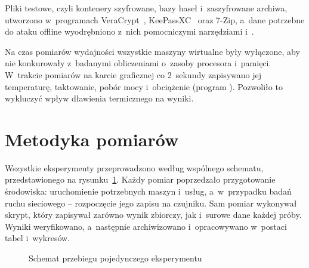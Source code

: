 Pliki testowe, czyli kontenery szyfrowane, bazy haseł i~zaszyfrowane archiwa, utworzono w~programach VeraCrypt~\cite{veracrypt}, KeePassXC~\cite{keepassxc} oraz 7-Zip, a~dane potrzebne do ataku offline wyodrębniono z~nich pomocniczymi narzędziami  i~.

Na czas pomiarów wydajności wszystkie maszyny wirtualne były wyłączone, aby nie konkurowały z~badanymi obliczeniami o~zasoby procesora i~pamięci. W~trakcie pomiarów na karcie graficznej co 2~sekundy zapisywano jej temperaturę, taktowanie, pobór mocy i~obciążenie (program ). Pozwoliło to wykluczyć wpływ dławienia termicznego na wyniki.

\section{Metodyka pomiarów}\label{sec:metodyka}

Wszystkie eksperymenty przeprowadzono według wspólnego schematu, przedstawionego na rysunku~\ref{rys:przebieg}. Każdy pomiar poprzedzało przygotowanie środowiska: uruchomienie potrzebnych maszyn i~usług, a~w~przypadku badań ruchu sieciowego -- rozpoczęcie jego zapisu na czujniku. Sam pomiar wykonywał skrypt, który zapisywał zarówno wynik zbiorczy, jak i~surowe dane każdej próby. Wyniki weryfikowano, a~następnie archiwizowano i~opracowywano w~postaci tabel i~wykresów.

\begin{figure}[htbp]
\centering
{}
\caption{Schemat przebiegu pojedynczego eksperymentu}
\label{rys:przebieg}
\end{figure}

